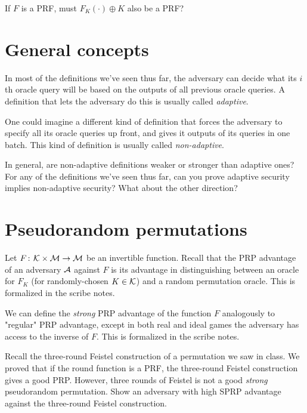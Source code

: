 \documentclass{article}
\newcommand{\keyspace}{\calK}
\begin{document}
\begin{question}
If $F$ is a PRF, must $F_K(\cdot)\oplus K$ also be a PRF?
\end{question}

\section*{General concepts}

\begin{question} In most of the definitions we've seen thus far, the adversary can decide what its $i$th oracle query will be based on the outputs of all previous oracle queries. A definition that lets the adversary do this is usually called \emph{adaptive}. 

One could imagine a different kind of definition that forces the adversary to specify all its oracle queries up front, and gives it outputs of its queries in one batch. This kind of definition is usually called \emph{non-adaptive}. 

In general, are non-adaptive definitions weaker or stronger than adaptive ones? For any of the definitions we've seen thus far, can you prove adaptive security implies non-adaptive security? What about the other direction?
\end{question}

\section*{Pseudorandom permutations}

Let $F\Colon\keyspace\times\msgspace\rightarrow\msgspace$ be an invertible function. Recall that the PRP advantage of an adversary ${\mathcal A}$ against $F$ is its advantage in distinguishing between an oracle for $F_K$ (for randomly-chosen $K\in\keyspace$) and a random permutation oracle. This is formalized in the scribe notes. 

We can define the \emph{strong} PRP advantage of the function $F$ analogously to "regular" PRP advantage, except in both real and ideal games the adversary has access to the inverse of $F$. This is formalized in the scribe notes.

\begin{question} Recall the three-round Feistel construction of a permutation we saw in class. We proved that if the round function is a PRF, the three-round Feistel construction gives a good PRP. However, three rounds of Feistel is not a good \emph{strong} pseudorandom permutation. Show an adversary with high SPRP advantage against the three-round Feistel construction. 
\end{question}
\end{document}
